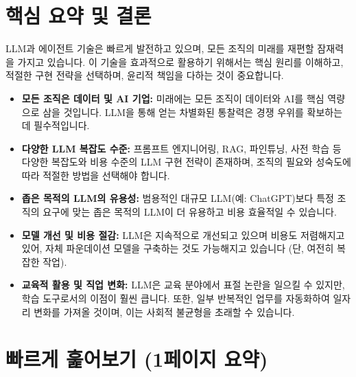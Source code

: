 \documentclass[11pt,a4paper]{article}
\theoremstyle{definition}
\begin{document}
\newpage
\section{핵심 요약 및 결론}

LLM과 에이전트 기술은 빠르게 발전하고 있으며, 모든 조직의 미래를 재편할 잠재력을 가지고 있습니다. 이 기술을 효과적으로 활용하기 위해서는 핵심 원리를 이해하고, 적절한 구현 전략을 선택하며, 윤리적 책임을 다하는 것이 중요합니다.

\begin{itemize}
    \item \textbf{모든 조직은 데이터 및 AI 기업:} 미래에는 모든 조직이 데이터와 AI를 핵심 역량으로 삼을 것입니다. LLM을 통해 얻는 차별화된 통찰력은 경쟁 우위를 확보하는 데 필수적입니다.
    \item \textbf{다양한 LLM 복잡도 수준:} 프롬프트 엔지니어링, RAG, 파인튜닝, 사전 학습 등 다양한 복잡도와 비용 수준의 LLM 구현 전략이 존재하며, 조직의 필요와 성숙도에 따라 적절한 방법을 선택해야 합니다.
    \item \textbf{좁은 목적의 LLM의 유용성:} 범용적인 대규모 LLM(예: ChatGPT)보다 특정 조직의 요구에 맞는 좁은 목적의 LLM이 더 유용하고 비용 효율적일 수 있습니다.
    \item \textbf{모델 개선 및 비용 절감:} LLM은 지속적으로 개선되고 있으며 비용도 저렴해지고 있어, 자체 파운데이션 모델을 구축하는 것도 가능해지고 있습니다 (단, 여전히 복잡한 작업).
    \item \textbf{교육적 활용 및 직업 변화:} LLM은 교육 분야에서 표절 논란을 일으킬 수 있지만, 학습 도구로서의 이점이 훨씬 큽니다. 또한, 일부 반복적인 업무를 자동화하여 일자리 변화를 가져올 것이며, 이는 사회적 불균형을 초래할 수 있습니다.
\end{itemize}

\newpage
\section{빠르게 훑어보기 (1페이지 요약)}
\end{document}
